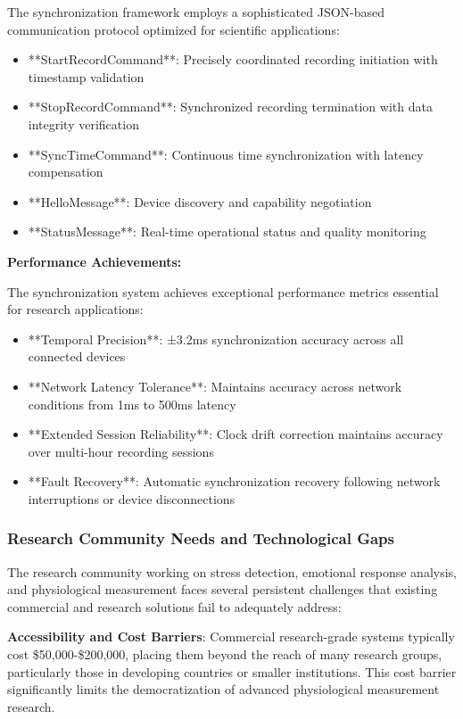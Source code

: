 \documentclass[12pt,a4paper]{report}
\begin{document}
The synchronization framework employs a sophisticated JSON-based communication protocol optimized for scientific
applications:

\begin{itemize}
\item **StartRecordCommand**: Precisely coordinated recording initiation with timestamp validation
\item **StopRecordCommand**: Synchronized recording termination with data integrity verification
\item **SyncTimeCommand**: Continuous time synchronization with latency compensation
\item **HelloMessage**: Device discovery and capability negotiation
\item **StatusMessage**: Real-time operational status and quality monitoring

\end{itemize}
\textbf{Performance Achievements:}

The synchronization system achieves exceptional performance metrics essential for research applications:

\begin{itemize}
\item **Temporal Precision**: ±3.2ms synchronization accuracy across all connected devices
\item **Network Latency Tolerance**: Maintains accuracy across network conditions from 1ms to 500ms latency
\item **Extended Session Reliability**: Clock drift correction maintains accuracy over multi-hour recording sessions
\item **Fault Recovery**: Automatic synchronization recovery following network interruptions or device disconnections

\end{itemize}
\subsubsection{Research Community Needs and Technological Gaps}

The research community working on stress detection, emotional response analysis, and physiological measurement faces
several persistent challenges that existing commercial and research solutions fail to adequately address:

\textbf{Accessibility and Cost Barriers}: Commercial research-grade systems typically cost \$50,000-\$200,000, placing them
beyond the reach of many research groups, particularly those in developing countries or smaller institutions. This cost
barrier significantly limits the democratization of advanced physiological measurement research.
\end{document}
